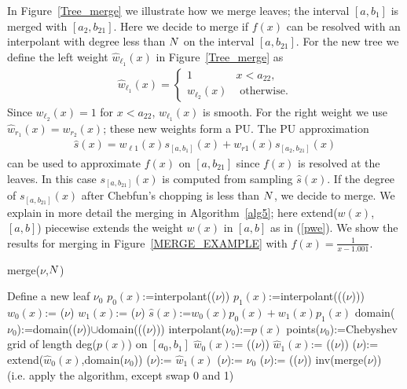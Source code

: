 In Figure~\ref{Tree_merge} we illustrate how we merge leaves; the interval $[a,b_{1}]$ is merged with $[a_2,b_{21}]$. Here we decide to merge if $f(x)$ can be resolved with an interpolant with degree less than $N$ on the interval $[a,b_{21}]$. For the new tree we define the left weight $\hat{w}_{\ell_1}(x)$ in Figure~\ref{Tree_merge} as
\begin{align}
\hat{w}_{\ell_1}(x) = \begin{cases} 
                1 & x<a_{22}, \\
                w_{\ell_2}(x) & \text{ otherwise.}        
\end{cases}
\label{pwe}
\end{align}
Since $w_{\ell_2}(x)=1$ for $x<a_{22}$, $\hat{w}_{\ell_1}(x)$ is smooth. For the right weight we use $\hat{w}_{r_1}(x) = w_{r_2}(x)$; these new weights form a PU. The PU approximation
\begin{align}
\hat{s}(x)=w_{\ell 1}(x) s_{[a,b_{1}]}(x)+w_{r 1}(x) s_{[a_2,b_{21}]}(x)
\end{align}
can be used to approximate  $f(x)$ on $[a,b_{21}]$ since $f(x)$ is resolved at the leaves. In this case $s_{[a,b_{21}]}(x)$ is computed from sampling $\hat{s}(x)$. If the degree of $s_{[a,b_{21}]}(x)$ after Chebfun's chopping is less than $N$, we decide to merge. We explain in more detail the merging in Algorithm~\ref{alg5}; here extend($w(x)$,$[a,b]$) piecewise extends the weight $w(x)$ in $[a,b]$ as in (\ref{pwe}).  We show the results for merging in Figure~\ref{MERGE_EXAMPLE} with $f(x)=\frac{1}{x-1.001}$.

\begin{algorithm}[!h]
\caption{merge($\nu$,$N$)}
\label{alg5}
\begin{algorithmic}
\STATE Define a new leaf $\nu_0$
\STATE $p_0(x)$:=\textsf{interpolant}(($\nu$))
\STATE $p_1(x)$:=\textsf{interpolant}((($\nu$)))
\STATE $w_0(x)$:= ($\nu$)
\STATE $w_1(x)$:= ($\nu$)
\STATE $\hat{s}(x)$:=$w_0(x)p_0(x)+w_1(x)p_1(x)$
\STATE \textsf{domain}($\nu_0$):=\textsf{domain}(($\nu$))$\cup$\textsf{domain}((($\nu$)))
\STATE \textsf{interpolant}($\nu_0$):=$p(x)$
\STATE \textsf{points}($\nu_0$):=Chebyshev grid of length deg($p(x)$) on $[a_0,b_1]$
\STATE $\hat{w}_0(x)$:=  (($\nu$))
\STATE $\hat{w}_1(x)$:=  (($\nu$))
\STATE {}($\nu$):= extend($\hat{w}_0(x)$,\textsf{domain}($\nu_0$))
\STATE {}($\nu$):= $\hat{w}_1(x)$
\STATE {}($\nu$):= $\nu_0$
\STATE {}($\nu$):= (($\nu$))
\ENDIF
{}
\STATE inv(merge($\nu$)) (i.e. apply the algorithm, except swap 0 and 1)
\ENDIF
\end{algorithmic}
\end{algorithm}

